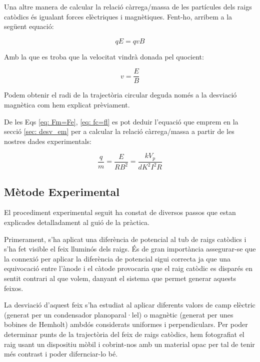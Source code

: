 \documentclass[11pt]{article}
\numberwithin{equation}{section}
\numberwithin{figure}{section}
\numberwithin{table}{section}
\begin{document}
\vspace{1cm}

Una altre manera de calcular la relació càrrega/massa de les partícules dels raigs catòdics és igualant forces elèctriques i magnètiques. Fent-ho, arribem a la següent equació:

\begin{equation}\label{eq: Fm=Fe}
    qE = qvB
\end{equation}

Amb la que es troba que la velocitat vindrà donada pel quocient:

\begin{equation}
    v = \frac{E}{B}
\end{equation}

Podem obtenir el radi de la trajectòria circular deguda només a la desviació magnètica com hem explicat prèviament.

De les Eqs \eqref{eq: Fm=Fe}, \eqref{eq: fc=fl} es pot deduir l'equació que emprem en la secció \ref{sec: desv_em} per a calcular la relació càrrega/massa a partir de les nostres dades experimentals:

\begin{equation}
    \frac{q}{m}=\frac{E}{RB^2}=\frac{kV_p}{dK^2I^2R}
\end{equation}

\newpage
\subsection{Mètode Experimental}

El procediment experimental seguit ha constat de diversos passos que estan explicades detalladament al guió de la pràctica.

Primerament, s'ha aplicat una diferència de potencial al tub de raigs catòdics i s'ha fet visible el feix lluminós dels raigs. És de gran importància assegurar-se que la connexió per aplicar la diferència de potencial sigui correcta ja que una equivocació entre l'ànode i el càtode provocaria que el raig catòdic es disparés en sentit contrari al que volem, danyant el sistema que permet generar aquests feixos.

La desviació d'aquest feix s'ha estudiat al aplicar diferents valors de camp elèctric (generat per un condensador planoparal·lel) o magnètic (generat per unes bobines de Hemholt) ambdós considerats uniformes i perpendiculars. Per poder determinar punts de la trajectòria del feix de raigs catòdics, hem fotografiat el raig usant un dispositiu mòbil i cobrint-nos amb un material opac per tal de tenir més contrast i poder difernciar-lo bé.
\end{document}
